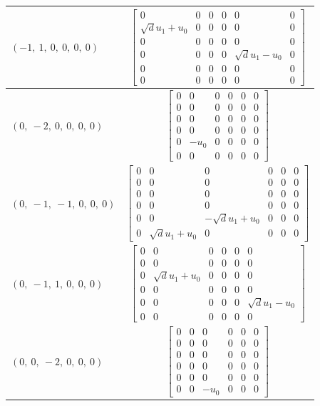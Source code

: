 \documentclass[11pt]{article}
\theoremstyle{definition}
\begin{document}
\begin{longtable}{|l|c|}
    \hline
    $\left( -1, \  1, \  0, \  0, \  0, \  0\right)$ & ${\left[\begin{matrix}0 & 0 & 0 & 0 & 0 & 0\\\sqrt{d} u_{1} + u_{0} & 0 & 0 & 0 & 0 & 0\\0 & 0 & 0 & 0 & 0 & 0\\0 & 0 & 0 & 0 & \sqrt{d} u_{1} - u_{0} & 0\\0 & 0 & 0 & 0 & 0 & 0\\0 & 0 & 0 & 0 & 0 & 0\end{matrix}\right]}$ \\
    \hline
    $\left( 0, \  -2, \  0, \  0, \  0, \  0\right)$ & ${\left[\begin{matrix}0 & 0 & 0 & 0 & 0 & 0\\0 & 0 & 0 & 0 & 0 & 0\\0 & 0 & 0 & 0 & 0 & 0\\0 & 0 & 0 & 0 & 0 & 0\\0 & - u_{0} & 0 & 0 & 0 & 0\\0 & 0 & 0 & 0 & 0 & 0\end{matrix}\right]}$ \\
    \hline
    $\left( 0, \  -1, \  -1, \  0, \  0, \  0\right)$ & ${\left[\begin{matrix}0 & 0 & 0 & 0 & 0 & 0\\0 & 0 & 0 & 0 & 0 & 0\\0 & 0 & 0 & 0 & 0 & 0\\0 & 0 & 0 & 0 & 0 & 0\\0 & 0 & - \sqrt{d} u_{1} + u_{0} & 0 & 0 & 0\\0 & \sqrt{d} u_{1} + u_{0} & 0 & 0 & 0 & 0\end{matrix}\right]}$ \\
    \hline
    $\left( 0, \  -1, \  1, \  0, \  0, \  0\right)$ & ${\left[\begin{matrix}0 & 0 & 0 & 0 & 0 & 0\\0 & 0 & 0 & 0 & 0 & 0\\0 & \sqrt{d} u_{1} + u_{0} & 0 & 0 & 0 & 0\\0 & 0 & 0 & 0 & 0 & 0\\0 & 0 & 0 & 0 & 0 & \sqrt{d} u_{1} - u_{0}\\0 & 0 & 0 & 0 & 0 & 0\end{matrix}\right]}$ \\
    \hline
    $\left( 0, \  0, \  -2, \  0, \  0, \  0\right)$ & ${\left[\begin{matrix}0 & 0 & 0 & 0 & 0 & 0\\0 & 0 & 0 & 0 & 0 & 0\\0 & 0 & 0 & 0 & 0 & 0\\0 & 0 & 0 & 0 & 0 & 0\\0 & 0 & 0 & 0 & 0 & 0\\0 & 0 & - u_{0} & 0 & 0 & 0\end{matrix}\right]}$ \\

\end{longtable}
\end{document}
